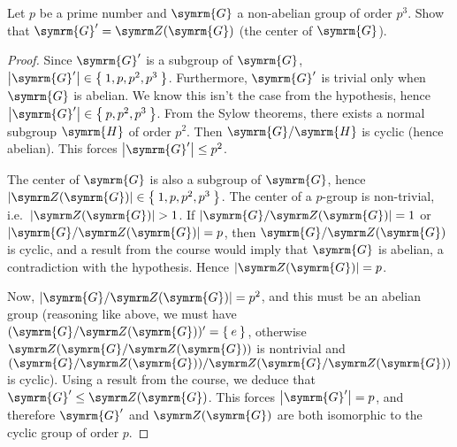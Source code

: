 \begin{exercise}
Let \(p\) be a prime number and \(\symrm{G}\) a non-abelian group of order \(p^3\). Show that \(\symrm{G}' = \centerofgroup(\symrm{G})\) (the center of \(\symrm{G}\)).
\end{exercise}
\begin{proof}
Since \(\symrm{G}'\) is a subgroup of \(\symrm{G}\), \(\abs{\symrm{G}'} \in \Set{1, p, p^2, p^3}\). Furthermore, \(\symrm{G}'\) is trivial only when \(\symrm{G}\) is abelian. We know this isn't the case from the hypothesis, hence \(\abs{\symrm{G}'} \in \Set{p, p^2, p^3}\). From the Sylow theorems, there exists a normal subgroup \(\symrm{H}\) of order \(p^2\). Then \(\symrm{G} / \symrm{H}\) is cyclic (hence abelian). This forces \(\abs{\symrm{G}'} \leq p^2\).

The center of \(\symrm{G}\) is also a subgroup of \(\symrm{G}\), hence \(\abs{\centerofgroup(\symrm{G})} \in \Set{1, p, p^2, p^3}\). The center of a \(p\)-group is non-trivial, i.e.\ \(\abs{\centerofgroup(\symrm{G})} > 1\). If \(\abs{\symrm{G} / \centerofgroup(\symrm{G})} = 1\) or \(\abs{\symrm{G} / \centerofgroup(\symrm{G})} = p\), then \(\symrm{G} / \centerofgroup(\symrm{G})\) is cyclic, and a result from the course would imply that \(\symrm{G}\) is abelian, a contradiction with the hypothesis. Hence \(\abs{\centerofgroup(\symrm{G})} = p\).

Now, \(\abs{\symrm{G} / \centerofgroup(\symrm{G})} = p^2\), and this must be an abelian group (reasoning like above, we must have \((\symrm{G} / \centerofgroup(\symrm{G}))' = \Set{e}\), otherwise \(\centerofgroup(\symrm{G} / \centerofgroup(\symrm{G}))\) is nontrivial and \((\symrm{G} / \centerofgroup(\symrm{G})) / \centerofgroup(\symrm{G} / \centerofgroup(\symrm{G}))\) is cyclic). Using a result from the course, we deduce that \(\symrm{G}' \leq \centerofgroup(\symrm{G})\). This forces \(\abs{\symrm{G}'} = p\), and therefore \(\symrm{G}'\) and \(\centerofgroup(\symrm{G})\) are both isomorphic to the cyclic group of order \(p\).
\end{proof}